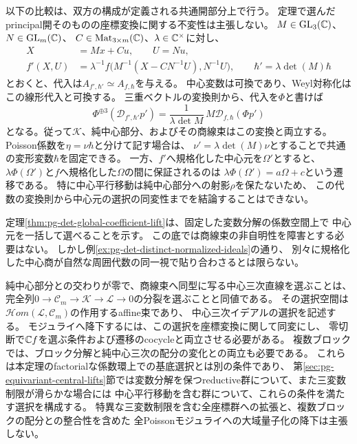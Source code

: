\begin{remark}[ブロックを保つ座標変換]
\label{rem:pg-det-block-covariance}
以下の比較は、双方の構成が定義される共通開部分上で行う。
定理で選んだprincipal開そのものの座標変換に関する不変性は主張しない。
$M\in\mathrm{GL}_3(\mathbb C)$、$N\in\mathrm{GL}_m(\mathbb C)$、
$C\in\operatorname{Mat}_{3\times m}(\mathbb C)$、$\lambda\in\mathbb C^\times$に対し、
\begin{equation}
 \begin{aligned}
 X&=Mx+Cu,\qquad U=Nu,\\
 f'(X,U)&=\lambda^{-1}
 f\bigl(M^{-1}(X-CN^{-1}U),N^{-1}U\bigr),\qquad
 \hbar'=\lambda\det(M)\hbar
 \end{aligned}
 \label{eq:pg-det-block-coordinate-change}
\end{equation}
とおくと、代入は$A_{f',\hbar'}\simeq A_{f,\hbar}$を与える。
中心変数は可換であり、Weyl対称化はこの線形代入と可換する。
三重ベクトルの変換則から、代入を$\Phi$と書けば
\begin{equation}
 \Phi^{\oplus3}(\mathcal D_{f',\hbar'}p')
 =\frac1{\lambda\det M}\,
 M\mathcal D_{f,\hbar}(\Phi p')
 \label{eq:pg-det-divided-matrix-covariance}
\end{equation}
となる。従って$\mathcal K$、純中心部分、およびその商線束はこの変換と両立する。
Poisson係数を$\eta=\nu\hbar$と分けて記す場合は、
$\nu'=\lambda\det(M)\nu$とすることで共通の変形変数$\hbar$を固定できる。
一方、$f'$へ規格化した中心元を$\Omega'$とすると、
$\lambda\Phi(\Omega')$と$f$へ規格化した$\Omega$の間に保証されるのは
$\lambda\Phi(\Omega')=a\Omega+c$という遷移である。
特に中心平行移動は純中心部分への射影$\rho$を保たないため、
この代数の変換則から中心元の選択の同変性までを結論することはできない。
\end{remark}

\begin{remark}[係数空間上の存在とモジュライへの降下]
\label{rem:pg-det-global-descent-scope}
定理\ref{thm:pg-det-global-coefficient-lift}は、固定した変数分解の係数空間上で
中心元を一括して選べることを示す。
この底では商線束の非自明性を障害とする必要はない。
しかし例\ref{ex:pg-det-distinct-normalized-ideals}の通り、
別々に規格化した中心商が自然な周囲代数の同一視で貼り合わさるとは限らない。

純中心部分との交わりが零で、商線束へ同型に写る中心三次直線を選ぶことは、
完全列$0\to\mathcal C_m\to\mathcal K\to\mathcal L\to0$の分裂を選ぶことと同値である。
その選択空間は$\mathcal Hom(\mathcal L,\mathcal C_m)$の作用するaffine束であり、
中心三次イデアルの選択を記述する。
モジュライへ降下するには、この選択を座標変換に関して同変にし、
零切断で$\mathbb C f$を選ぶ条件および遷移のcocycleと両立させる必要がある。
複数ブロックでは、ブロック分解と純中心三次の配分の変化との両立も必要である。
これらは本定理のfactorialな係数環上での基底選択とは別の条件であり、
第\ref{sec:pg-equivariant-central-lifts}節では変数分解を保つreductive群について、また三変数制限が滑らかな場合には
中心平行移動を含む群について、これらの条件を満たす選択を構成する。
特異な三変数制限を含む全座標群への拡張と、複数ブロックの配分との整合性を含めた
全Poissonモジュライへの大域量子化の降下は主張しない。
\end{remark}

